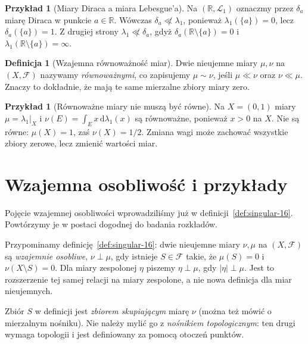 \documentclass[11pt,a4paper,oneside]{book}
\numberwithin{equation}{chapter}
\theoremstyle{plain}
\theoremstyle{definition}
\newtheorem{definicja}[twierdzenie]{Definicja}
\newtheorem{przyklad}[twierdzenie]{Przykład}
\theoremstyle{remark}
\begin{document}
\begin{przyklad}[Miary Diraca a miara Lebesgue'a]
Na $(\mathbb R,\mathcal L_1)$ oznaczmy przez $\delta_a$ miarę Diraca
w punkcie $a\in\mathbb R$. Wówczas $\delta_a\not\ll\lambda_1$,
ponieważ $\lambda_1(\{a\})=0$, lecz $\delta_a(\{a\})=1$.
Z drugiej strony $\lambda_1\not\ll\delta_a$, gdyż
$\delta_a(\mathbb R\setminus\{a\})=0$ i
$\lambda_1(\mathbb R\setminus\{a\})=\infty$.
\end{przyklad}

\begin{definicja}[Wzajemna równoważność miar]
\label{def:equivalent-measures-17}
Dwie nieujemne miary $\mu,\nu$ na $(X,\mathcal F)$ nazywamy
\emph{równoważnymi}, co zapisujemy $\mu\sim\nu$,
jeśli $\mu\ll\nu$ oraz $\nu\ll\mu$.
Znaczy to dokładnie, że mają te same mierzalne zbiory miary zero.
\end{definicja}

\begin{przyklad}[Równoważne miary nie muszą być równe]
Na $X=(0,1)$ miary $\mu=\lambda_1|_X$ i
$\nu(E)=\int_E x\,\mathrm d\lambda_1(x)$ są równoważne,
ponieważ $x>0$ na $X$. Nie są równe: $\mu(X)=1$,
zaś $\nu(X)=1/2$. Zmiana wagi może zachować wszystkie
zbiory zerowe, lecz zmienić wartości miar.
\end{przyklad}

\section{Wzajemna osobliwość i przykłady}
Pojęcie wzajemnej osobliwości wprowadziliśmy już w
definicji~\ref{def:singular-16}. Powtórzymy je w postaci dogodnej
do badania rozkładów.

Przypominamy definicję~\ref{def:singular-16}:
dwie nieujemne miary $\nu,\mu$ na $(X,\mathcal F)$ są
\emph{wzajemnie osobliwe}, $\nu\perp\mu$, gdy istnieje
$S\in\mathcal F$ takie, że $\mu(S)=0$ i
$\nu(X\setminus S)=0$. Dla miary zespolonej $\eta$
piszemy $\eta\perp\mu$, gdy $|\eta|\perp\mu$.
Jest to rozszerzenie tej samej relacji na miary zespolone,
a nie nowa definicja dla miar nieujemnych.

Zbiór $S$ w definicji jest \emph{zbiorem skupiającym}
miarę $\nu$ (można też mówić o mierzalnym nośniku). Nie należy mylić go z
\emph{nośnikiem topologicznym}: ten drugi wymaga topologii
i jest definiowany za pomocą otoczeń punktów.
\end{document}

